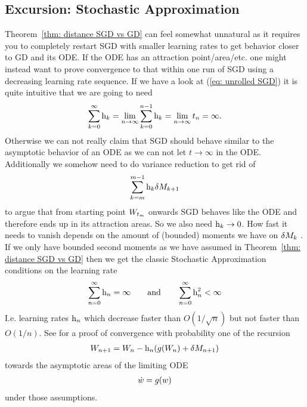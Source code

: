 \subsection{Excursion: Stochastic Approximation}

Theorem~\ref{thm: distance SGD vs GD} can feel somewhat unnatural as it requires
you to completely restart SGD with smaller learning rates to get behavior closer
to GD and its ODE. If the ODE has an attraction point/area/etc. one might
instead want to prove convergence to that within one run of SGD using a
decreasing learning rate sequence. If we have a look at (\ref{eq: unrolled SGD})
it is quite intuitive that we are going to need
\begin{align*}
	\sum_{k=0}^\infty \text{h}_k = \lim_{n\to\infty}\sum_{k=0}^{n-1} \text{h}_k
	= \lim_{n\to\infty}t_n = \infty.
\end{align*}
Otherwise we can not really claim that SGD should behave similar to the asymptotic
behavior of an ODE as we can not let \(t\to\infty\) in the ODE. Additionally
we somehow need to do variance reduction to get rid of
\begin{align*}
	\sum_{k=m}^{m-1} \text{h}_k\delta M_{k+1}
\end{align*}
to argue that from starting point \(W_{t_m}\) onwards SGD behaves like the ODE
and therefore ends up in its attraction areas. So we also need
\(\text{h}_k \to 0\). How fast it needs to vanish depends on the amount of (bounded)
moments we have on \(\delta M_k\) \parencite[p. 110]{kushnerStochasticApproximationAlgorithms1997}.
If we only have bounded second moments as we have assumed in Theorem~\ref{thm:
distance SGD vs GD} then we get the classic Stochastic Approximation conditions
on the learning rate
\begin{align*}
	\sum_{n=0}^\infty \text{h}_n = \infty \qquad \text{and} \qquad \sum_{n=0}^\infty \text{h}_n^2 <\infty
\end{align*}
I.e. learning rates \(\text{h}_n\) which decrease faster than \(O(1/\sqrt{n})\) but
not faster than \(O(1/n)\). See \textcite[ch.
5]{kushnerStochasticApproximationAlgorithms1997} for a proof of
convergence with probability one of the recursion
\begin{align*}
	W_{n+1} = W_n - \text{h}_n(g(W_n) + \delta M_{n+1})
\end{align*}
towards the asymptotic areas of the limiting
ODE
\begin{align*}
	\dot{w} = g(w)
\end{align*}
under those assumptions.

